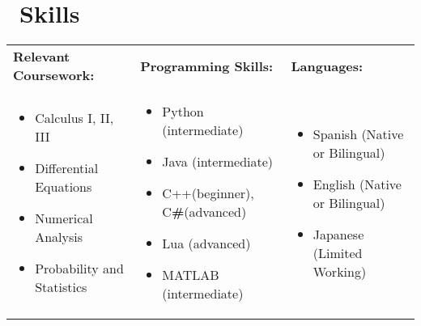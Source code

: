 \documentclass{resume}
\begin{document}
\section{\faCogs\ Skills}
\begin{tabularx}{\textwidth}{X X X}
    \small \textbf{Relevant Coursework:}  & \small \textbf{Programming Skills:}  & \small \textbf {Languages:}\\
    \vspace{-0.5em}\begin{itemize}[parsep=0.5ex]
       \item Calculus I, II, III
        \item Differential Equations
        \item Numerical Analysis
        \item Probability and Statistics        
    \end{itemize} &
    \vspace{-0.5em}\begin{itemize}[parsep=0.5ex]
        \item Python (intermediate) 
        \item Java (intermediate)
        \item C++(beginner), C{\scriptsize\bf \#}(advanced)
        \item Lua (advanced)
        \item MATLAB (intermediate)
    \end{itemize} &
     \vspace{-0.5em}\begin{itemize}[parsep=0.5ex]
        \item Spanish (Native or Bilingual)
        \item English (Native or Bilingual)
        \item Japanese (Limited Working)
    \end{itemize}\\
\end{tabularx}
\end{document}
